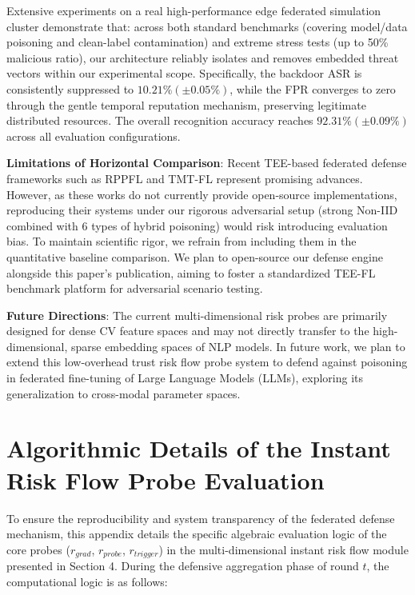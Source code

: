 \documentclass[runningheads]{llncs}
\begin{document}
Extensive experiments on a real high-performance edge federated simulation cluster demonstrate that: across both standard benchmarks (covering model/data poisoning and clean-label contamination) and extreme stress tests (up to 50\% malicious ratio), our architecture reliably isolates and removes embedded threat vectors within our experimental scope. Specifically, the backdoor ASR is consistently suppressed to $10.21\% (\pm 0.05\%)$, while the FPR converges to zero through the gentle temporal reputation mechanism, preserving legitimate distributed resources. The overall recognition accuracy reaches $92.31\% (\pm 0.09\%)$ across all evaluation configurations.

\textbf{Limitations of Horizontal Comparison}: Recent TEE-based federated defense frameworks such as RPPFL \cite{zhang2025rppfl} and TMT-FL \cite{lu2025tmt} represent promising advances. However, as these works do not currently provide open-source implementations, reproducing their systems under our rigorous adversarial setup (strong Non-IID combined with 6 types of hybrid poisoning) would risk introducing evaluation bias. To maintain scientific rigor, we refrain from including them in the quantitative baseline comparison. We plan to open-source our defense engine alongside this paper's publication, aiming to foster a standardized TEE-FL benchmark platform for adversarial scenario testing.

\textbf{Future Directions}: The current multi-dimensional risk probes are primarily designed for dense CV feature spaces and may not directly transfer to the high-dimensional, sparse embedding spaces of NLP models. In future work, we plan to extend this low-overhead trust risk flow probe system to defend against poisoning in federated fine-tuning of Large Language Models (LLMs), exploring its generalization to cross-modal parameter spaces.

\appendix
\section{Algorithmic Details of the Instant Risk Flow Probe Evaluation}
To ensure the reproducibility and system transparency of the federated defense mechanism, this appendix details the specific algebraic evaluation logic of the core probes ($r_{grad}$, $r_{probe}$, $r_{trigger}$) in the multi-dimensional instant risk flow module presented in Section 4. During the defensive aggregation phase of round $t$, the computational logic is as follows:
\end{document}
